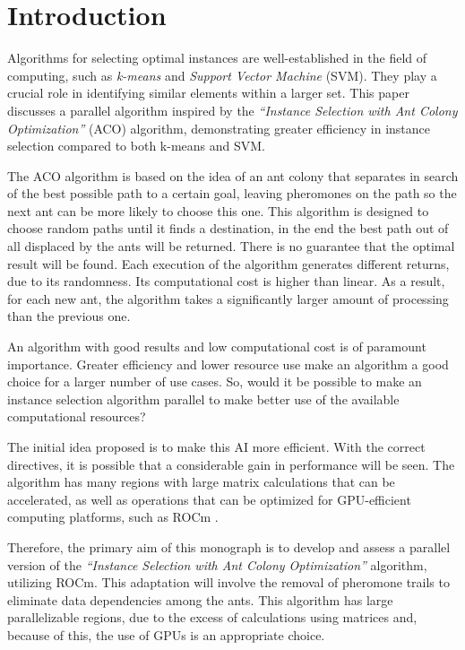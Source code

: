 \section{Introduction}

Algorithms for selecting optimal instances are well-established in the field of computing, such as \emph{k-means} and \emph{Support Vector Machine} (SVM). They play a crucial role in identifying similar elements within a larger set. This paper discusses a parallel algorithm inspired by the \emph{``Instance Selection with Ant Colony Optimization''} (ACO) algorithm, demonstrating greater efficiency in instance selection compared to both k-means and SVM.

The ACO algorithm is based on the idea of an ant colony that separates in search of the best possible path to a certain goal, leaving pheromones on the path so the next ant can be more likely to choose this one. This algorithm is designed to choose random paths until it finds a destination, in the end the best path out of all displaced by the ants will be returned. There is no guarantee that the optimal result will be found. Each execution of the algorithm generates different returns, due to its randomness. Its computational cost is higher than linear. As a result, for each new ant, the algorithm takes a significantly larger amount of processing than the previous one.

An algorithm with good results and low computational cost is of paramount importance. Greater efficiency and lower resource use make an algorithm a good choice for a larger number of use cases. So, would it be possible to make an instance selection algorithm parallel to make better use of the available computational resources?

The initial idea proposed is to make this AI more efficient. With the correct directives, it is possible that a considerable gain in performance will be seen. The algorithm has many regions with large matrix calculations that can be accelerated, as well as operations that can be optimized for GPU-efficient computing platforms, such as ROCm \cite{rocm}.

Therefore, the primary aim of this monograph is to develop and assess a parallel version of the \emph{``Instance Selection with Ant Colony Optimization''} algorithm, utilizing ROCm. This adaptation will involve the removal of pheromone trails to eliminate data dependencies among the ants.
This algorithm has large parallelizable regions, due to the excess of calculations using matrices and, because of this, the use of GPUs is an appropriate choice.

